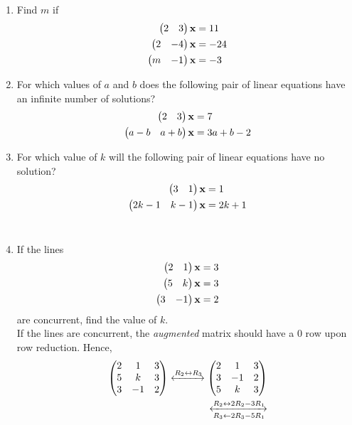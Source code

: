 \documentclass[journal,12pt,twocolumn]{IEEEtran}
\renewcommand\thesection{\arabic{section}}
\begin{document}
\begin{enumerate}[label=\thesection.\arabic*.,ref=\thesection.\theenumi]
\item Find $m$ if 
\begin{align}
\begin{split}
\begin{pmatrix}2 & 3 \end{pmatrix}\mathbf{x}&=11
\\
\begin{pmatrix}2 & -4 \end{pmatrix}\mathbf{x}&=-24
\\
\begin{pmatrix}m & -1 \end{pmatrix}\mathbf{x}&=-3
\\
\end{split}
\end{align}
%
\solution 
%
\item For which values of $a$ and $b$ does the following pair of linear equations have an infinite number of solutions?
\begin{align}
\begin{split}
\begin{pmatrix}2 & 3 \end{pmatrix}\mathbf{x}&=7
\\
\begin{pmatrix}a-b & a+b \end{pmatrix}\mathbf{x}&=3a+b-2
\end{split}
\end{align}
\solution 
%
%
\item For which value of $k$ will the following pair of linear equations have no solution?
\begin{align}
\begin{split}
\begin{pmatrix}3 & 1 \end{pmatrix}\mathbf{x}&=1
\\
\begin{pmatrix}2k-1 & k-1 \end{pmatrix}\mathbf{x}&=2k+1
\end{split}
\end{align}
\\
\solution
%
\item If the lines 
\begin{align}
\begin{pmatrix}2 & 1\end{pmatrix}\mathbf{x}  = 3
\\
\begin{pmatrix}5 & k\end{pmatrix}\mathbf{x}  = 3
\\
\begin{pmatrix}3 & -1\end{pmatrix}\mathbf{x}  = 2
\end{align}
%
are concurrent, find the value of $k$.
%
\\
\solution If the lines are concurrent, the {\em augmented}  matrix should have a 0 row upon row reduction.  Hence, 
%
\begin{align}
\myvec{
2 & 1 & 3
\\
5 & k & 3
\\
3 & -1 & 2
}
\xleftrightarrow{R_2\leftrightarrow R_3}
\myvec{
2 & 1 & 3
\\
3 & -1 & 2
\\
5 & k & 3
}
\\
\xleftrightarrow [R_3\leftarrow 2R_3-5R_1]{R_2\leftrightarrow 2R_2-3R_1}

\end{align}
\end{enumerate}
\end{document}
